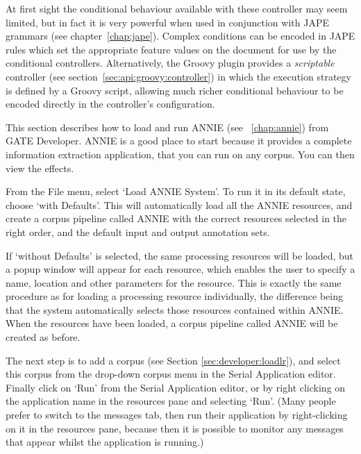 At first sight the conditional behaviour available with these controller may
seem limited, but in fact it is very powerful when used in conjunction with
JAPE grammars (see chapter~\ref{chap:jape}).  Complex conditions can be encoded
in JAPE rules which set the appropriate feature values on the document for use
by the conditional controllers.  Alternatively, the Groovy plugin provides a
\emph{scriptable} controller (see section~\ref{sec:api:groovy:controller}) in
which the execution strategy is defined by a Groovy script, allowing much
richer conditional behaviour to be encoded directly in the controller's
configuration.


This section describes how to load and run ANNIE (see
\Chapthing~\ref{chap:annie}) from GATE Developer. ANNIE is a good place to
start because it provides a complete information extraction application, that
you can run on any corpus. You can then view the effects.

From the File menu, select `Load ANNIE System'. To run it in its
default state, choose `with Defaults'. This will automatically load
all the ANNIE resources, and create a corpus pipeline called ANNIE with the
correct resources selected in the right order, and the default input and
output annotation sets.

If `without Defaults' is selected, the same processing resources
will be loaded, but a popup window will appear for each resource,
which enables the user to specify a name, location and other parameters
for the resource. This is exactly the same procedure as for loading a
processing resource individually, the difference being that the
system automatically selects those resources contained within
ANNIE. When the resources have been loaded, a corpus pipeline called
ANNIE will be created as before.

The next step is to add a corpus (see Section \ref{sec:developer:loadlr}), and
select this corpus from the drop-down corpus menu in the Serial Application
editor. Finally click on `Run' from the Serial Application editor, or by right
clicking on the application name in the resources pane and selecting `Run'.
(Many people prefer to switch to the messages tab, then run their application
by right-clicking on it in the resources pane, because then it is possible to
monitor any messages that appear whilst the application is running.)

